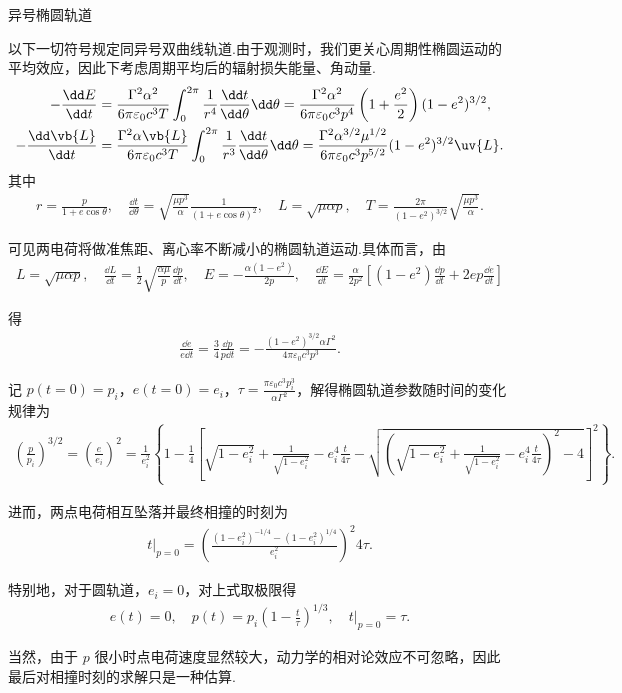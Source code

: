 \begin{exbox}
	异号椭圆轨道

	以下一切符号规定同异号双曲线轨道.由于观测时，我们更关心周期性椭圆运动的平均效应，因此下考虑周期平均后的辐射损失能量、角动量.
	\begin{align*}
		-\frac{\dd E}{\dd t} &= \frac{\Gamma^2 \alpha^2}{6\pi\varepsilon_0 c^3 T} \int_{0}^{2\pi} \frac{1}{r^4} \frac{\dd t}{\dd \theta} \dd \theta = \frac{\Gamma^2 \alpha^2}{6\pi\varepsilon_0 c^3 p^4} \left(1 + \frac{e^2}{2}\right) (1 - e^2)^{3/2}, \\
		-\frac{\dd \vb{L}}{\dd t} &= \frac{\Gamma^2 \alpha \vb{L}}{6\pi\varepsilon_0 c^3 T} \int_{0}^{2\pi} \frac{1}{r^3} \frac{\dd t}{\dd \theta} \dd \theta = \frac{\Gamma^2 \alpha^{3/2} \mu^{1/2}}{6\pi\varepsilon_0 c^3 p^{5/2}} (1 - e^2)^{3/2} \uv{L}.
	\end{align*}
	其中
	\begin{align*}
		r = \frac{p}{1 + e\cos\theta}, \quad \frac{\dd t}{\dd \theta} = \sqrt{\frac{\mu p^3}{\alpha}} \frac{1}{(1 + e\cos\theta)^2}, \quad L = \sqrt{\mu\alpha p}, \quad T = \frac{2\pi}{(1 - e^2)^{3/2}} \sqrt{\frac{\mu p^3}{\alpha}}.
	\end{align*}

	可见两电荷将做准焦距、离心率不断减小的椭圆轨道运动.具体而言，由
	\begin{align*}
		L = \sqrt{\mu\alpha p}, \quad \frac{\dd L}{\dd t} = \frac{1}{2}\sqrt{\frac{\alpha\mu}{p}} \frac{\dd p}{\dd t}, \quad E = -\frac{\alpha(1 - e^2)}{2p}, \quad \frac{\dd E}{\dd t} = \frac{\alpha}{2p^2}\left[(1 - e^2)\frac{\dd p}{\dd t} + 2ep\frac{\dd e}{\dd t}\right]
	\end{align*}

	得
	\begin{align*}
		\frac{\dd e}{e \dd t} = \frac{3}{4}\frac{\dd p}{p \dd t} = -\frac{(1 - e^2)^{3/2} \alpha \Gamma^2}{4\pi\varepsilon_0 c^3 p^3}.
	\end{align*}

	记 \(p(t=0) = p_i\)，\(e(t=0) = e_i\)，\(\tau = \frac{\pi\varepsilon_0 c^3 p_i^3}{\alpha \Gamma^2}\)，解得椭圆轨道参数随时间的变化规律为
	\begin{align*}
		\left(\frac{p}{p_i}\right)^{3/2} = \left(\frac{e}{e_i}\right)^2 = \frac{1}{e_i^2}\left\{1 - \frac{1}{4}\left[\sqrt{1 - e_i^2} + \frac{1}{\sqrt{1 - e_i^2}} - e_i^4 \frac{t}{4\tau} - \sqrt{\left(\sqrt{1 - e_i^2} + \frac{1}{\sqrt{1 - e_i^2}} - e_i^4 \frac{t}{4\tau}\right)^2 - 4}\right]^2\right\}.
	\end{align*}

	进而，两点电荷相互坠落并最终相撞的时刻为
	\begin{align*}
		t\big|_{p=0} = \left(\frac{(1 - e_i^2)^{-1/4} - (1 - e_i^2)^{1/4}}{e_i^2}\right)^2 4\tau.
	\end{align*}

	特别地，对于圆轨道，\(e_i = 0\)，对上式取极限得
	\begin{align*}
		e(t) = 0, \quad p(t) = p_i \left(1 - \frac{t}{\tau}\right)^{1/3}, \quad t\big|_{p=0} = \tau.
	\end{align*}

	当然，由于 \(p\) 很小时点电荷速度显然较大，动力学的相对论效应不可忽略，因此最后对相撞时刻的求解只是一种估算.
\end{exbox}

